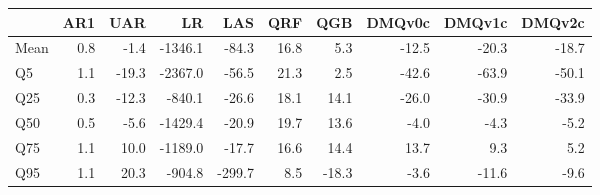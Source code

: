 \begin{tabular}{lrrrrrrrrr}
\toprule
 & AR1 & UAR & LR & LAS & QRF & QGB & DMQv0c & DMQv1c & DMQv2c \\
\midrule
Mean & 0.8 & -1.4 & -1346.1 & -84.3 & 16.8 & 5.3 & -12.5 & -20.3 & -18.7 \\
Q5 & 1.1 & -19.3 & -2367.0 & -56.5 & 21.3 & 2.5 & -42.6 & -63.9 & -50.1 \\
Q25 & 0.3 & -12.3 & -840.1 & -26.6 & 18.1 & 14.1 & -26.0 & -30.9 & -33.9 \\
Q50 & 0.5 & -5.6 & -1429.4 & -20.9 & 19.7 & 13.6 & -4.0 & -4.3 & -5.2 \\
Q75 & 1.1 & 10.0 & -1189.0 & -17.7 & 16.6 & 14.4 & 13.7 & 9.3 & 5.2 \\
Q95 & 1.1 & 20.3 & -904.8 & -299.7 & 8.5 & -18.3 & -3.6 & -11.6 & -9.6 \\
\bottomrule
\end{tabular}
